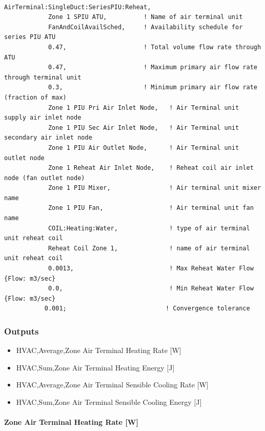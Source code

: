\begin{lstlisting}

AirTerminal:SingleDuct:SeriesPIU:Reheat,
            Zone 1 SPIU ATU,          ! Name of air terminal unit
            FanAndCoilAvailSched,     ! Availability schedule for series PIU ATU
            0.47,                     ! Total volume flow rate through ATU
            0.47,                     ! Maximum primary air flow rate through terminal unit
            0.3,                      ! Minimum primary air flow rate (fraction of max)
            Zone 1 PIU Pri Air Inlet Node,   ! Air Terminal unit supply air inlet node
            Zone 1 PIU Sec Air Inlet Node,   ! Air Terminal unit secondary air inlet node
            Zone 1 PIU Air Outlet Node,      ! Air Terminal unit outlet node
            Zone 1 Reheat Air Inlet Node,    ! Reheat coil air inlet node (fan outlet node)
            Zone 1 PIU Mixer,                ! Air terminal unit mixer name
            Zone 1 PIU Fan,                  ! Air terminal unit fan name
            COIL:Heating:Water,              ! type of air terminal unit reheat coil
            Reheat Coil Zone 1,              ! name of air terminal unit reheat coil
            0.0013,                          ! Max Reheat Water Flow {Flow: m3/sec}
            0.0,                             ! Min Reheat Water Flow {Flow: m3/sec}
           0.001;                           ! Convergence tolerance
\end{lstlisting}

\subsubsection{Outputs}\label{outputs-7}

\begin{itemize}
\item
  HVAC,Average,Zone Air Terminal Heating Rate {[}W{]}
\item
  HVAC,Sum,Zone Air Terminal Heating Energy {[}J{]}
\item
  HVAC,Average,Zone Air Terminal Sensible Cooling Rate {[}W{]}
\item
  HVAC,Sum,Zone Air Terminal Sensible Cooling Energy {[}J{]}
\end{itemize}

\paragraph{Zone Air Terminal Heating Rate {[}W{]}}\label{zone-air-terminal-heating-rate-w}

